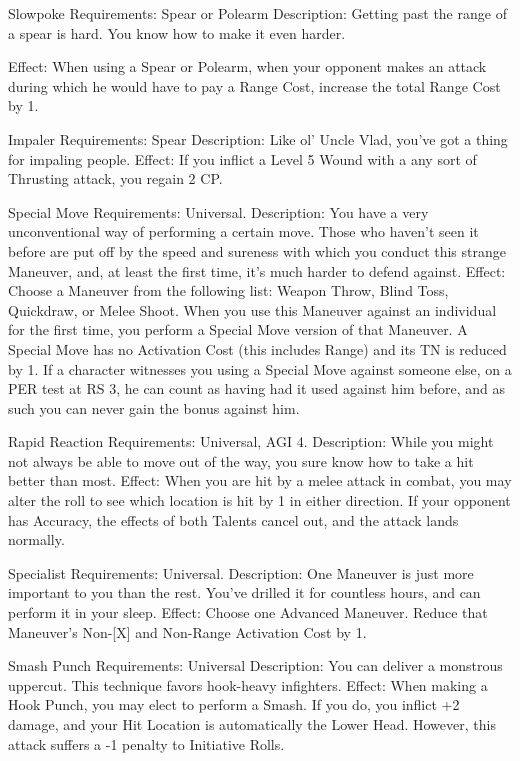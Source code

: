 \documentclass[oneside,11pt,english]{book}
\begin{document}
 

Slowpoke 
Requirements: Spear or Polearm 
Description: Getting past the range of a spear is hard. You know how to make it even harder. 


Effect: When using a Spear or Polearm, when your opponent makes an attack during which he would 
have to pay a Range Cost, increase the total Range Cost by 1. 

 

Impaler 
Requirements: Spear 
Description: Like ol’ Uncle Vlad, you’ve got a thing for impaling people. 
Effect: If you inflict a Level 5 Wound with a any sort of Thrusting attack, you regain 2 CP. 

 

Special Move 
Requirements: Universal. 
Description: You have a very unconventional way of performing a certain move. Those who haven't seen 
it before are put off by the speed and sureness with which you conduct this strange Maneuver, and, at 
least the first time, it's much harder to defend against. 
Effect: Choose a Maneuver from the following list: Weapon Throw, Blind Toss, Quickdraw, or Melee 
Shoot. When you use this Maneuver against an individual for the first time, you perform a Special Move 
version of that Maneuver. A Special Move has no Activation Cost (this includes Range) and its TN is 
reduced by 1. If a character witnesses you using a Special Move against someone else, on a PER test at 
RS 3, he can count as having had it used against him before, and as such you can never gain the bonus 
against him. 

 

Rapid Reaction 
Requirements: Universal, AGI 4. 
Description: While you might not always be able to move out of the way, you sure know how to take a 
hit better than most. 
Effect: When you are hit by a melee attack in combat, you may alter the roll to see which location is hit 
by 1 in either direction. If your opponent has Accuracy, the effects of both Talents cancel out, and the 
attack lands normally. 

 

Specialist 
Requirements: Universal. 
Description: One Maneuver is just more important to you than the rest. You’ve drilled it for countless 
hours, and can perform it in your sleep. 
Effect: Choose one Advanced Maneuver. Reduce that Maneuver’s Non-[X] and Non-Range Activation 
Cost by 1. 

 

Smash Punch 
Requirements: Universal 
Description: You can deliver a monstrous uppercut. This technique favors hook-heavy infighters. 
Effect: When making a Hook Punch, you may elect to perform a Smash. If you do, you inflict +2 
damage, and your Hit Location is automatically the Lower Head. However, this attack suffers a -1 penalty 
to Initiative Rolls. 
\end{document}
